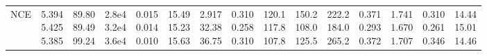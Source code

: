 \begin{landscape}
\begin{table}[t]
{\begin{tabular}{@{}lrrrrrrrrrrrrrr@{}}
NCE & \makecell[r]{5.394\\5.425\\5.385} & \makecell[r]{89.80\\89.49\\99.24} & \makecell[r]{2.8e4\\3.2e4\\3.6e4} & \makecell[r]{0.015\\0.014\\0.010} & \makecell[r]{15.49\\15.23\\15.63} & \makecell[r]{2.917\\32.38\\36.75} & \makecell[r]{0.310\\0.258\\0.310} & \makecell[r]{120.1\\117.8\\107.8} & \makecell[r]{150.2\\108.0\\125.5} & \makecell[r]{222.2\\184.0\\265.2} & \makecell[r]{0.371\\0.293\\0.372} & \makecell[r]{1.741\\1.670\\1.707} & \makecell[r]{0.310\\0.261\\0.346} & \makecell[r]{14.44\\15.01\\14.46} \\

\end{tabular}}
\end{table}
\end{landscape}
